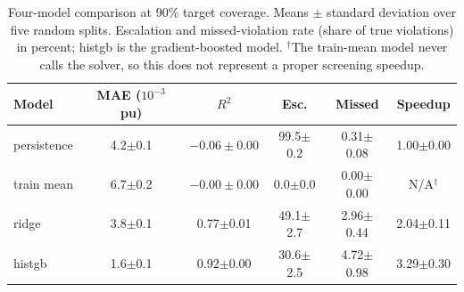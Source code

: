 \documentclass[conference]{IEEEtran}
\begin{document}
\begin{table}[!t]
\caption{Four-model comparison at 90\% target coverage. Means $\pm$ standard deviation over five random splits. Escalation and missed-violation rate (share of true violations) in percent; histgb is the gradient-boosted model. $^{\dagger}$The train-mean model never calls the solver, so this does not represent a proper screening speedup.}
\label{tab:models}
\centering
\footnotesize
\setlength{\tabcolsep}{1pt}
\begin{tabular}{lccccc}
\hline
Model & MAE ($10^{-3}$ pu) & $R^2$ & Esc. & Missed & Speedup \\
\hline
persistence & 4.2$\pm$0.1 & $-0.06\pm0.00$ & 99.5$\pm$0.2 & 0.31$\pm$0.08 & 1.00$\pm$0.00 \\
train mean  & 6.7$\pm$0.2 & $-0.00\pm0.00$ & 0.0$\pm$0.0 & 0.00$\pm$0.00 & N/A$^{\dagger}$ \\
ridge       & 3.8$\pm$0.1 & 0.77$\pm$0.01 & 49.1$\pm$2.7 & 2.96$\pm$0.44 & 2.04$\pm$0.11 \\
histgb      & 1.6$\pm$0.1 & 0.92$\pm$0.00 & 30.6$\pm$2.5 & 4.72$\pm$0.98 & 3.29$\pm$0.30 \\
\hline
\end{tabular}

\vspace{3ex}


\end{table}
\end{document}
